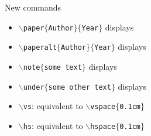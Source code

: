 \documentclass[10pt,numbering,toc]{bpslides}
\begin{document}
\begin{frame}{New commands}
	\begin{itemize}
	\item \texttt{$\backslash$paper$\{$Author$\}\{$Year$\}$} displays \vs
	\item \texttt{$\backslash$paperalt$\{$Author$\}\{$Year$\}$} displays \vs
	\item \texttt{$\backslash$note$\{$some text$\}$} displays \vs
	\item \texttt{$\backslash$under$\{$some other text$\}$} displays \vs
	\item \texttt{$\backslash$vs}: equivalent to \texttt{$\backslash$vspace$\{$0.1cm$\}$}\vs
	\item \texttt{$\backslash$hs}: equivalent to \texttt{$\backslash$hspace$\{$0.1cm$\}$}\vs
	\end{itemize}
\end{frame}
\end{document}
